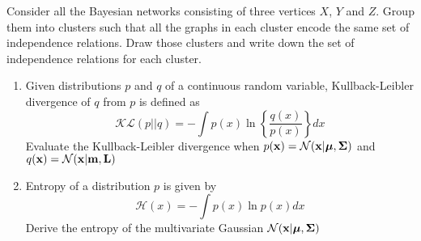 \documentclass{amsmlaj}
\begin{document}

\begin{problem}
Consider all the Bayesian networks consisting of three vertices $X$, $Y$ and $Z$. Group them into clusters such that all the graphs in each cluster encode the same set of independence relations. Draw those clusters and write down the set of independence relations for each cluster.
\end{problem}

\begin{problem}
\begin{enumerate}
 \item Given distributions $p$ and $q$ of a continuous random variable, Kullback-Leibler divergence of $q$ from $p$ is defined as
    \begin{equation}
    \mathcal{KL}(p||q)= - \int {p(x)\ln \left\{ {\frac{{q(x)}}{{p(x)}}} \right\}} dx \nonumber
    \end{equation}
    Evaluate the Kullback-Leibler divergence when $p(\bm{\mathbf{x}})=\mathcal{N}(\bm{\mathbf{x}}|\bm{\mathbf{\mu}},\bm{\mathbf{\Sigma}})$ and $q(\bm{\mathbf{x}})=\mathcal{N}(\bm{\mathbf{x}}|\bm{\mathbf{m}},\bm{\mathbf{L}})$
\item Entropy of a distribution $p$ is given by
    \begin{equation}
    \mathcal{H}(x) = - \int {p(x)\ln p(x)} dx\nonumber
    \end{equation}
    Derive the entropy of the multivariate Gaussian $\mathcal{N}(\bm{\mathbf{x}}|\bm{\mathbf{\mu}},\bm{\mathbf{\Sigma}})$
\end{enumerate}
\end{problem}
\end{document}
